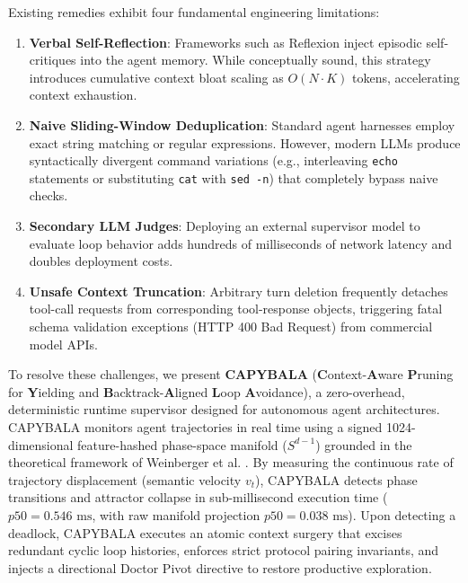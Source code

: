 \documentclass[journal]{IEEEtran}
\begin{document}
Existing remedies exhibit four fundamental engineering limitations:
\begin{enumerate}[leftmargin=12pt, topsep=2pt, itemsep=1pt]
    \item \textbf{Verbal Self-Reflection}: Frameworks such as Reflexion \cite{shinn2023reflexion} inject episodic self-critiques into the agent memory. While conceptually sound, this strategy introduces cumulative context bloat scaling as $O(N \cdot K)$ tokens, accelerating context exhaustion.
    \item \textbf{Naive Sliding-Window Deduplication}: Standard agent harnesses employ exact string matching or regular expressions. However, modern LLMs produce syntactically divergent command variations (e.g., interleaving \texttt{echo} statements or substituting \texttt{cat} with \texttt{sed -n}) that completely bypass naive checks.
    \item \textbf{Secondary LLM Judges}: Deploying an external supervisor model to evaluate loop behavior adds hundreds of milliseconds of network latency and doubles deployment costs.
    \item \textbf{Unsafe Context Truncation}: Arbitrary turn deletion frequently detaches tool-call requests from corresponding tool-response objects, triggering fatal schema validation exceptions (HTTP 400 Bad Request) from commercial model APIs.
\end{enumerate}

To resolve these challenges, we present \textbf{CAPYBALA} (\textbf{C}ontext-\textbf{A}ware \textbf{P}runing for \textbf{Y}ielding and \textbf{B}acktrack-\textbf{A}ligned \textbf{L}oop \textbf{A}voidance), a zero-overhead, deterministic runtime supervisor designed for autonomous agent architectures. CAPYBALA monitors agent trajectories in real time using a signed 1024-dimensional feature-hashed phase-space manifold ($S^{d-1}$) grounded in the theoretical framework of Weinberger et al. \cite{weinberger2009feature}. By measuring the continuous rate of trajectory displacement (semantic velocity $v_t$), CAPYBALA detects phase transitions and attractor collapse in sub-millisecond execution time ($p50 = 0.546\text{ ms}$, with raw manifold projection $p50 = 0.038\text{ ms}$). Upon detecting a deadlock, CAPYBALA executes an atomic context surgery that excises redundant cyclic loop histories, enforces strict protocol pairing invariants, and injects a directional Doctor Pivot directive to restore productive exploration.
\end{document}

